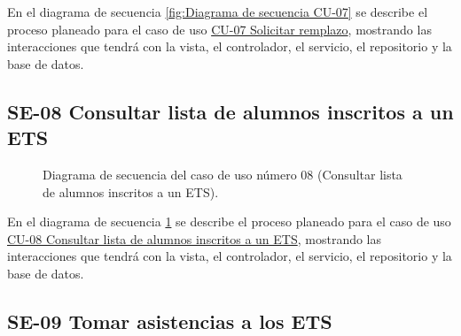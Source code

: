En el diagrama de secuencia \ref{fig:Diagrama de secuencia CU-07} se describe el proceso planeado para el caso de uso \hyperlink{CU-07}{CU-07 Solicitar remplazo}, mostrando las interacciones que tendrá con la vista, el controlador, el servicio, el repositorio y la base de datos.

\newpage

\subsection{SE-08 Consultar lista de alumnos inscritos a un ETS}

\begin{figure}[htbp!]
	\begin{center}
		\caption{Diagrama de secuencia del caso de uso número 08 (Consultar lista de alumnos inscritos a un ETS).}
		\label{fig:Diagrama de secuencia CU-08}
	\end{center}
\end{figure}

En el diagrama de secuencia \ref{fig:Diagrama de secuencia CU-08} se describe el proceso planeado para el caso de uso \hyperlink{CU-08}{CU-08 Consultar lista de alumnos inscritos a un ETS}, mostrando las interacciones que tendrá con la vista, el controlador, el servicio, el repositorio y la base de datos.

\newpage

\subsection{SE-09 Tomar asistencias a los ETS}

